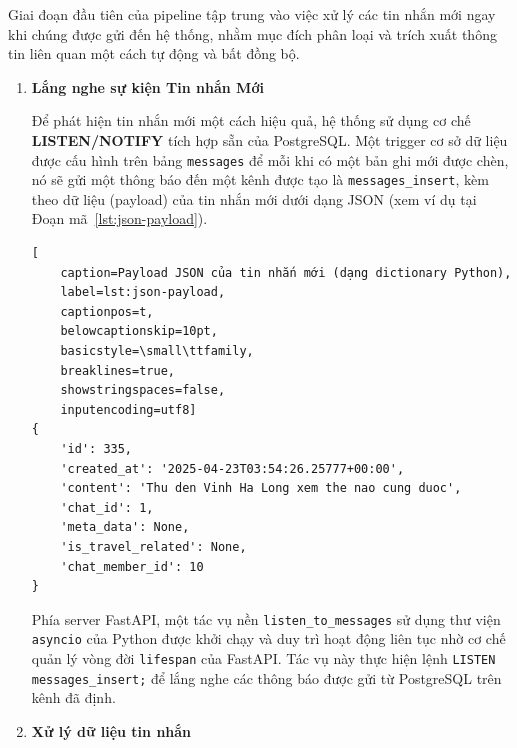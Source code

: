 Giai đoạn đầu tiên của pipeline tập trung vào việc xử lý các tin nhắn mới ngay khi chúng được gửi đến hệ thống, nhằm mục đích phân loại và trích xuất thông tin liên quan một cách tự động và bất đồng bộ.
\begin{enumerate}
    \item  \textbf{Lắng nghe sự kiện Tin nhắn Mới}

 Để phát hiện tin nhắn mới một cách hiệu quả, hệ thống sử dụng cơ chế \textbf{LISTEN/NOTIFY} tích hợp sẵn của PostgreSQL. Một trigger cơ sở dữ liệu được cấu hình trên bảng \texttt{messages} để mỗi khi có một bản ghi mới được chèn, nó sẽ gửi một thông báo đến một kênh được tạo là \texttt{messages\_insert}, kèm theo dữ liệu (payload) của tin nhắn mới dưới dạng JSON (xem ví dụ tại Đoạn mã~\ref{lst:json-payload}). %
 \newpage
 \lstset{language=json}
\begin{lstlisting}[
    caption=Payload JSON của tin nhắn mới (dạng dictionary Python),
    label=lst:json-payload,
    captionpos=t,
    belowcaptionskip=10pt,
    basicstyle=\small\ttfamily,
    breaklines=true,
    showstringspaces=false,
    inputencoding=utf8] 
{
    'id': 335,
    'created_at': '2025-04-23T03:54:26.25777+00:00',
    'content': 'Thu den Vinh Ha Long xem the nao cung duoc',
    'chat_id': 1,
    'meta_data': None,
    'is_travel_related': None,
    'chat_member_id': 10
}
\end{lstlisting}

Phía server FastAPI, một tác vụ nền \texttt{listen\_to\_messages} sử dụng thư viện \texttt{asyncio} của Python được khởi chạy và duy trì hoạt động liên tục nhờ cơ chế quản lý vòng đời \texttt{lifespan} của FastAPI. Tác vụ này thực hiện lệnh \texttt{LISTEN messages\_insert;} để lắng nghe các thông báo được gửi từ PostgreSQL trên kênh đã định. %

\item  \textbf{Xử lý dữ liệu tin nhắn}


\end{enumerate}
